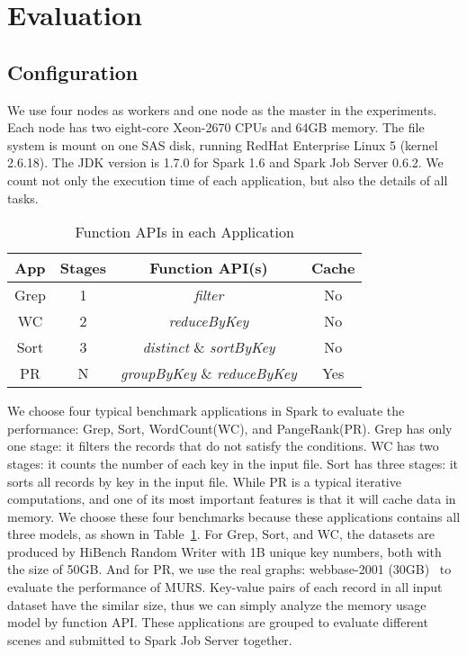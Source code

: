 \section{Evaluation}

\subsection{Configuration}

We use four nodes as workers and one node as the master in the experiments. Each node has two eight-core Xeon-2670 CPUs and 64GB memory. The file system is mount on one SAS disk, running RedHat Enterprise Linux 5 (kernel 2.6.18). The JDK version is 1.7.0 for Spark 1.6 and Spark Job Server 0.6.2. We count not only the execution time of each application, but also the details of all tasks.

\begin{table}[!t]
\small
\centering
\caption{Function APIs in each Application}
\begin{tabular}{ c | c | c | c }

\hline
\textbf{App} & \textbf{Stages} & \textbf{Function API(s)} & \textbf{Cache} \\
\hline
Grep & 1 & \textit{filter} & No \\
\hline
WC & 2 & \textit{reduceByKey} & No \\
\hline
Sort & 3 & \textit{distinct} \& \textit{sortByKey} & No \\
\hline
PR & N & \textit{groupByKey} \& \textit{reduceByKey} & Yes \\
\hline

\hline
\end{tabular}
\label{table:app}
\end{table} 

We choose four typical benchmark applications in Spark to evaluate the performance: Grep, Sort, WordCount(WC), and PangeRank(PR). Grep has only one stage: it filters the records that do not satisfy the conditions. WC has two stages: it counts the number of each key in the input file.  Sort has three stages: it sorts all records by key in the input file. While PR is a typical iterative computations, and one of its most important features is that it will cache data in memory. We choose these four benchmarks because these applications contains all three models, as shown in Table~\ref{table:app}. For Grep, Sort, and WC, the datasets are produced by HiBench Random Writer with 1B unique key numbers, both with the size of 50GB. And for PR, we use the real graphs: webbase-2001 (30GB)~\cite{boldi:webgraph} to evaluate the performance of MURS. Key-value pairs of each record in all input dataset have the similar size, thus we can simply analyze the memory usage model by function API. These applications are grouped to evaluate different scenes and submitted to Spark Job Server together.

